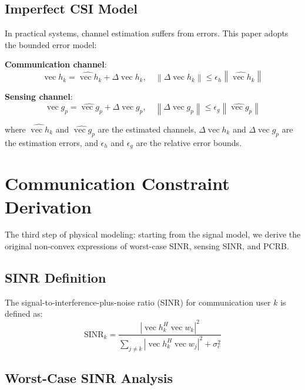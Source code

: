 \documentclass[12pt,a4paper]{article}
\DeclareMathOperator{\vect}{vec}
\newcommand{\norm}[1]{\left\|#1\right\|}
\begin{document}
\subsection{Imperfect CSI Model}

In practical systems, channel estimation suffers from errors. This paper adopts the bounded error model:

\textbf{Communication channel}:
\begin{equation}
\vect{h}_k = \hat{\vect{h}}_k + \Delta\vect{h}_k, \quad \norm{\Delta\vect{h}_k} \leq \epsilon_h \norm{\hat{\vect{h}}_k}
\end{equation}

\textbf{Sensing channel}:
\begin{equation}
\vect{g}_p = \hat{\vect{g}}_p + \Delta\vect{g}_p, \quad \norm{\Delta\vect{g}_p} \leq \epsilon_g \norm{\hat{\vect{g}}_p}
\end{equation}

where $\hat{\vect{h}}_k$ and $\hat{\vect{g}}_p$ are the estimated channels, $\Delta\vect{h}_k$ and $\Delta\vect{g}_p$ are the estimation errors, and $\epsilon_h$ and $\epsilon_g$ are the relative error bounds.

\section{Communication Constraint Derivation}

The third step of physical modeling: starting from the signal model, we derive the original non-convex expressions of worst-case SINR, sensing SINR, and PCRB.

\subsection{SINR Definition}

The signal-to-interference-plus-noise ratio (SINR) for communication user $k$ is defined as:
\begin{equation}
\text{SINR}_k = \frac{|\vect{h}_k^H \vect{w}_k|^2}{\sum_{j \neq k} |\vect{h}_k^H \vect{w}_j|^2 + \sigma_c^2} \tag{1}
\end{equation}

\subsection{Worst-Case SINR Analysis}
\end{document}
